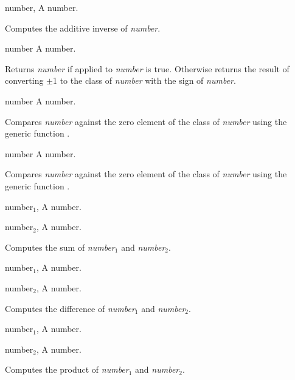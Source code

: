 \begin{optDefinition}
%
\begin{genericargs}
    \item[number, \classref{number}] A number.
\end{genericargs}
%
\result%
Computes the additive inverse of {\em number}.

%
\begin{arguments}
    \item[number] A number.
\end{arguments}
%
\result%
Returns {\em number\/} if  applied to {\em number\/} is true.
Otherwise returns the result of converting $\pm$1 to the class of {\em number\/}
with the sign of {\em number}.

%
\begin{arguments}
    \item[number] A number.
\end{arguments}
%
\result%
Compares {\em number\/} against the zero element of the class of {\em number\/}
using the generic function .

%
\begin{arguments}
    \item[number] A number.
\end{arguments}
%
\result%
Compares {\em number\/} against the zero element of the class of {\em number\/}
using the generic function .

%
\begin{genericargs}
    \item[number$_1$, \classref{number}] A number.
    \item[number$_2$, \classref{number}] A number.
\end{genericargs}
%
\result%
Computes the sum of {\em number$_1$} and {\em number$_2$}.

\begin{genericargs}
    \item[number$_1$, \classref{number}] A number.
    \item[number$_2$, \classref{number}] A number.
\end{genericargs}
%
\result%
Computes the difference of {\em number$_1$} and {\em number$_2$}.

%
\begin{genericargs}
    \item[number$_1$, \classref{number}] A number.
    \item[number$_2$, \classref{number}] A number.
\end{genericargs}
%
\result%
Computes the product of {\em number$_1$} and {\em number$_2$}.


\end{optDefinition}
